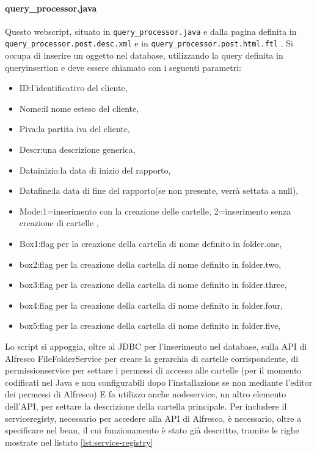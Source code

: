\paragraph{query\_processor.java}
Questo webscript, situato in \texttt{query\_processor.java} e dalla pagina definita in \texttt{query\_processor.post.desc.xml} e in \texttt{query\_processor.post.html.ftl} . Si occupa di inserire un oggetto nel database, utilizzando la query definita in  queryinsertion e deve essere chiamato con i seguenti parametri:
\begin{itemize}
\item ID:l’identificativo del cliente,
\item Nome:il nome esteso del cliente,
\item Piva:la partita iva del cliente,
\item Descr:una descrizione generica,
\item Datainizio:la data di inizio del rapporto,
\item Datafine:la data di fine del rapporto(se non presente, verrà settata a null),
\item Mode:1=inserimento con la creazione delle cartelle, 2=inserimento senza creazione di cartelle ,
\item Box1:flag per la creazione della cartella di nome definito in folder.one,
\item box2:flag per la creazione della cartella di nome definito in folder.two,
\item box3:flag per la creazione della cartella di nome definito in folder.three,
\item box4:flag per la creazione della cartella di nome definito in folder.four,
\item box5:flag per la creazione della cartella di nome definito in folder.five,
\end{itemize}
Lo script si appoggia, oltre al JDBC per l’inserimento nel database, sulla API di Alfresco 
FileFolderService per creare la gerarchia di cartelle corrispondente, di permissionservice per settare i permessi di accesso alle cartelle (per il momento codificati nel Java e non configurabili dopo l’installazione se non mediante l’editor dei permessi di Alfresco)
E fa utilizzo anche nodeservice, un altro elemento dell'API, per settare la descrizione della cartella principale.
Per includere il serviceregisty, necessario per accedere alla API di Alfresco, è necessario, oltre a specificare  nel bean, il cui funzionamento è stato già descritto, tramite le righe mostrate nel listato \ref{lst:service-registry}
